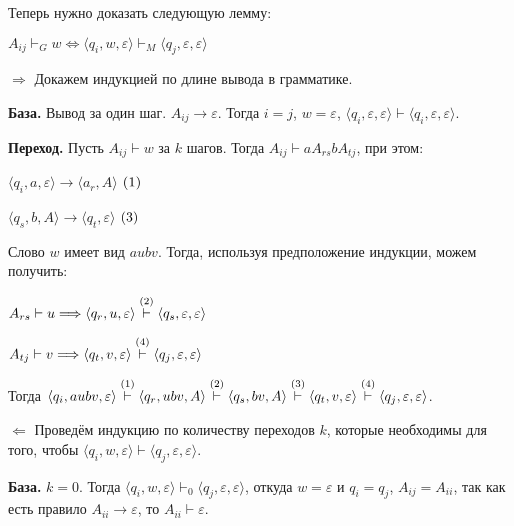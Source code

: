 
Теперь нужно доказать следующую лемму:

\Lemma $A_{ij} \vdash_G w \Longleftrightarrow \langle q_i, w, \varepsilon \rangle \vdash_M \langle q_j, \varepsilon, \varepsilon \rangle$

$\Longrightarrow$ Докажем индукцией по длине вывода в грамматике.

\textbf{База.} Вывод за один шаг. $A_{ij} \rightarrow \varepsilon$. Тогда $i = j$, $w = \varepsilon$, $\langle q_i, \varepsilon, \varepsilon \rangle \vdash \langle q_i, \varepsilon, \varepsilon \rangle$.

\textbf{Переход.} Пусть $A_{ij} \vdash w$ за $k$ шагов. Тогда $A_{ij} \vdash aA_{rs}bA_{tj}$, при этом:

\begin{center}
    $\langle q_i, a, \varepsilon \rangle \rightarrow \langle a_r, A \rangle$ $\left({1}\right)$
    
    $\langle q_s, b, A \rangle \rightarrow \langle q_t, \varepsilon \rangle$ $\left({3}\right)$
\end{center}

Слово $w$ имеет вид $aubv$. Тогда, используя предположение индукции, можем получить:

\begin{center}
    $A_{rs} \vdash u \Longrightarrow \langle q_r, u, \varepsilon \rangle \overset{\left({2}\right)}{\vdash} \langle q_s, \varepsilon, \varepsilon \rangle$
    
    $A_{tj} \vdash v \Longrightarrow \langle q_t, v, \varepsilon \rangle \overset{\left({4}\right)}{\vdash} \langle q_j, \varepsilon, \varepsilon \rangle$
\end{center}


Тогда $\langle q_i, aubv, \varepsilon \rangle \overset{\left({1}\right)}{\vdash} \langle q_r, ubv, A \rangle \overset{\left({2}\right)}{\vdash} \langle q_s, bv, A \rangle \overset{\left({3}\right)}{\vdash} \langle q_t, v, \varepsilon \rangle \overset{\left({4}\right)}{\vdash} \langle q_j, \varepsilon, \varepsilon \rangle$.

$\Longleftarrow$ Проведём индукцию по количеству переходов $k$, которые необходимы для того, чтобы $\langle q_i, w, \varepsilon \rangle \vdash \langle q_j, \varepsilon, \varepsilon \rangle$. 

\textbf{База.} $k = 0$. Тогда $\langle q_i, w, \varepsilon \rangle \vdash_0 \langle q_j, \varepsilon, \varepsilon \rangle$, откуда $w = \varepsilon$ и $q_i = q_j$, $A_{ij} = A_{ii}$, так как есть правило $A_{ii} \rightarrow \varepsilon$, то $A_{ii} \vdash \varepsilon$.

